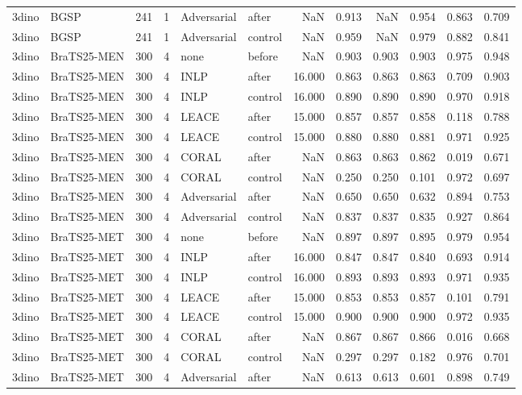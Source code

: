 \begin{tabular}{llrrllrrrrrr}
3dino & BGSP & 241 & 1 & Adversarial & after & NaN & 0.913 & NaN & 0.954 & 0.863 & 0.709 \\
3dino & BGSP & 241 & 1 & Adversarial & control & NaN & 0.959 & NaN & 0.979 & 0.882 & 0.841 \\
3dino & BraTS25-MEN & 300 & 4 & none & before & NaN & 0.903 & 0.903 & 0.903 & 0.975 & 0.948 \\
3dino & BraTS25-MEN & 300 & 4 & INLP & after & 16.000 & 0.863 & 0.863 & 0.863 & 0.709 & 0.903 \\
3dino & BraTS25-MEN & 300 & 4 & INLP & control & 16.000 & 0.890 & 0.890 & 0.890 & 0.970 & 0.918 \\
3dino & BraTS25-MEN & 300 & 4 & LEACE & after & 15.000 & 0.857 & 0.857 & 0.858 & 0.118 & 0.788 \\
3dino & BraTS25-MEN & 300 & 4 & LEACE & control & 15.000 & 0.880 & 0.880 & 0.881 & 0.971 & 0.925 \\
3dino & BraTS25-MEN & 300 & 4 & CORAL & after & NaN & 0.863 & 0.863 & 0.862 & 0.019 & 0.671 \\
3dino & BraTS25-MEN & 300 & 4 & CORAL & control & NaN & 0.250 & 0.250 & 0.101 & 0.972 & 0.697 \\
3dino & BraTS25-MEN & 300 & 4 & Adversarial & after & NaN & 0.650 & 0.650 & 0.632 & 0.894 & 0.753 \\
3dino & BraTS25-MEN & 300 & 4 & Adversarial & control & NaN & 0.837 & 0.837 & 0.835 & 0.927 & 0.864 \\
3dino & BraTS25-MET & 300 & 4 & none & before & NaN & 0.897 & 0.897 & 0.895 & 0.979 & 0.954 \\
3dino & BraTS25-MET & 300 & 4 & INLP & after & 16.000 & 0.847 & 0.847 & 0.840 & 0.693 & 0.914 \\
3dino & BraTS25-MET & 300 & 4 & INLP & control & 16.000 & 0.893 & 0.893 & 0.893 & 0.971 & 0.935 \\
3dino & BraTS25-MET & 300 & 4 & LEACE & after & 15.000 & 0.853 & 0.853 & 0.857 & 0.101 & 0.791 \\
3dino & BraTS25-MET & 300 & 4 & LEACE & control & 15.000 & 0.900 & 0.900 & 0.900 & 0.972 & 0.935 \\
3dino & BraTS25-MET & 300 & 4 & CORAL & after & NaN & 0.867 & 0.867 & 0.866 & 0.016 & 0.668 \\
3dino & BraTS25-MET & 300 & 4 & CORAL & control & NaN & 0.297 & 0.297 & 0.182 & 0.976 & 0.701 \\
3dino & BraTS25-MET & 300 & 4 & Adversarial & after & NaN & 0.613 & 0.613 & 0.601 & 0.898 & 0.749 \\

\end{tabular}
